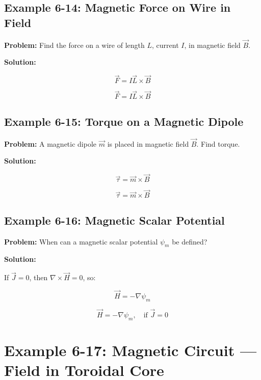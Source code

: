 \documentclass[12pt]{article}
\begin{document}
\subsection*{Example 6-14: Magnetic Force on Wire in Field}

\textbf{Problem:}  
Find the force on a wire of length \( L \), current \( I \), in magnetic field \( \vec{B} \).

\textbf{Solution:}

\[
\vec{F} = I \vec{L} \times \vec{B}
\]

\begin{tcolorbox}
\[
\boxed{\vec{F} = I \vec{L} \times \vec{B}}
\]
\end{tcolorbox}

\subsection*{Example 6-15: Torque on a Magnetic Dipole}

\textbf{Problem:}  
A magnetic dipole \( \vec{m} \) is placed in magnetic field \( \vec{B} \). Find torque.

\textbf{Solution:}

\[
\vec{\tau} = \vec{m} \times \vec{B}
\]

\begin{tcolorbox}
\[
\boxed{\vec{\tau} = \vec{m} \times \vec{B}}
\]
\end{tcolorbox}

\subsection*{Example 6-16: Magnetic Scalar Potential}

\textbf{Problem:}  
When can a magnetic scalar potential \( \psi_m \) be defined?

\textbf{Solution:}

If \( \vec{J} = 0 \), then \( \nabla \times \vec{H} = 0 \), so:

\[
\vec{H} = -\nabla \psi_m
\]

\begin{tcolorbox}
\[
\boxed{\vec{H} = -\nabla \psi_m}, \quad \text{if } \vec{J} = 0
\]
\end{tcolorbox}



\section*{Example 6-17: Magnetic Circuit — Field in Toroidal Core}
\end{document}
